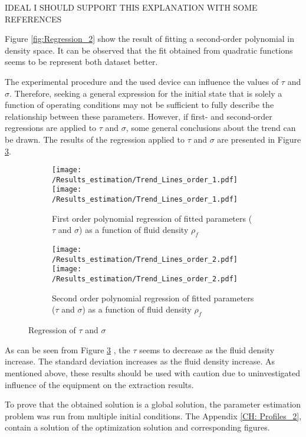 \documentclass[../Article_Model_Parameters.tex]{subfiles}
\begin{document}
	{\color{red}IDEAL I SHOULD SUPPORT THIS EXPLANATION WITH SOME REFERENCES}
	
	Figure \ref{fig:Regression_2} show the result of fitting a second-order polynomial in density space. It can be observed that the fit obtained from quadratic functions seems to be represent both dataset better. 
	
	The experimental procedure and the used device can influence the values of $\tau$ and $\sigma$. Therefore, seeking a general expression for the initial state that is solely a function of operating conditions may not be sufficient to fully describe the relationship between these parameters. However, if first- and second-order regressions are applied to $\tau$ and $\sigma$, some general conclusions about the trend can be drawn. The results of the regression applied to $\tau$ and $\sigma$ are presented in Figure \ref{fig:Regression_tau_simga}.
	
	\begin{figure}[!h]
		\centering
		\begin{subfigure}[b]{\columnwidth}
			\centering
			\texttt{[image: /Results\_estimation/Trend\_Lines\_order\_1.pdf]}
			\texttt{[image: /Results\_estimation/Trend\_Lines\_order\_1.pdf]}
			\caption{First order polynomial regression of fitted parameters ($\tau$ and $\sigma$) as a function of fluid density $\rho_f$}
			\label{fig:Regression_3}
		\end{subfigure}
		\begin{subfigure}[b]{\columnwidth}
			\centering
			\texttt{[image: /Results\_estimation/Trend\_Lines\_order\_2.pdf]}
			\texttt{[image: /Results\_estimation/Trend\_Lines\_order\_2.pdf]}
			\caption{Second order polynomial regression of fitted parameters ($\tau$ and $\sigma$) as a function of fluid density $\rho_f$}
			\label{fig:Regression_4}
		\end{subfigure}
		\caption{Regression of $\tau$ and $\sigma$} 
		\label{fig:Regression_tau_simga}
	\end{figure}

	As can be seen from Figure \ref{fig:Regression_tau_simga} , the $\tau$ seems to decrease as the fluid density increase. The standard deviation increases as the fluid density increase. As mentioned above, these results should be used with caution due to uninvestigated influence of the equipment on the extraction results.
	
	To prove that the obtained solution is a global solution, the parameter estimation problem was run from multiple initial conditions. The Appendix \ref{CH: Profiles_2}, contain a solution of the optimization solution and corresponding figures.
	
\end{document}
